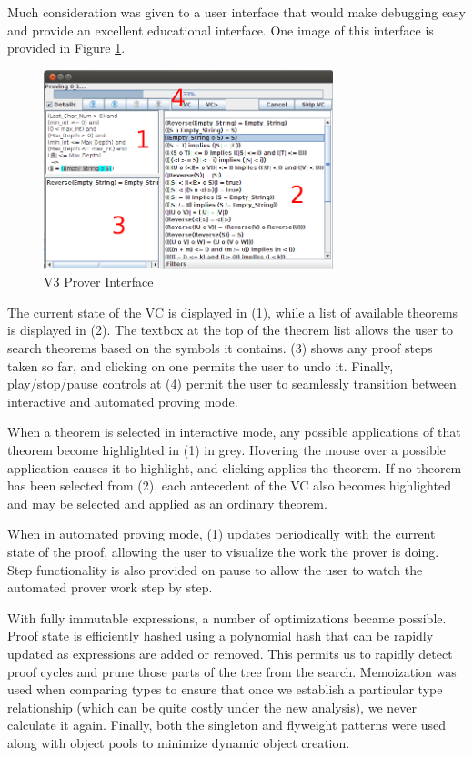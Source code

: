 Much consideration was given to a user interface that would make debugging easy and provide an excellent educational interface.  One image of this interface is provided in Figure \ref{newProverInterface}.

\begin{figure}
  \centering
    \includegraphics[width=0.75\textwidth]{newProverInterface}
  \caption{V3 Prover Interface\label{newProverInterface}}
\end{figure}

The current state of the VC is displayed in (1), while a list of available theorems is displayed in (2).  The textbox at the top of the theorem list allows the user to search theorems based on the symbols it contains.  (3) shows any proof steps taken so far, and clicking on one permits the user to undo it.  Finally, play/stop/pause controls at (4) permit the user to seamlessly transition between interactive and automated proving mode.

When a theorem is selected in interactive mode, any possible applications of that theorem become highlighted in (1) in grey.  Hovering the mouse over a possible application causes it to highlight, and clicking applies the theorem.  If no theorem has been selected from (2), each antecedent of the VC also becomes highlighted and may be selected and applied as an ordinary theorem.

When in automated proving mode, (1) updates periodically with the current state of the proof, allowing the user to visualize the work the prover is doing.  Step functionality is also provided on pause to allow the user to watch the automated prover work step by step.

With fully immutable expressions, a number of optimizations became possible.  Proof state is efficiently hashed using a polynomial hash that can be rapidly updated as expressions are added or removed.  This permits us to rapidly detect proof cycles and prune those parts of the tree from the search.  Memoization was used when comparing types to ensure that once we establish a particular type relationship (which can be quite costly under the new analysis), we never calculate it again.  Finally, both the singleton and flyweight patterns were used along with object pools to minimize dynamic object creation.

